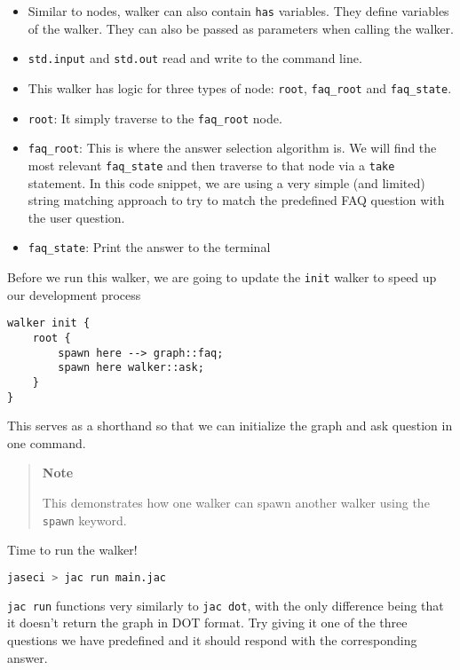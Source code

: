 \begin{itemize}
    \tightlist
    \item
          Similar to nodes, walker can also contain \lstinline!has! variables.
          They define variables of the walker. They can also be passed as
          parameters when calling the walker.
    \item
          \lstinline!std.input! and \lstinline!std.out! read and write to the
          command line.
    \item
          This walker has logic for three types of node: \lstinline!root!,
          \lstinline!faq_root! and \lstinline!faq_state!.
    \item
          \lstinline!root!: It simply traverse to the \lstinline!faq_root! node.
    \item
          \lstinline!faq_root!: This is where the answer selection algorithm is.
          We will find the most relevant \lstinline!faq_state! and then traverse
          to that node via a \lstinline!take! statement. In this code snippet,
          we are using a very simple (and limited) string matching approach to
          try to match the predefined FAQ question with the user question.
    \item
          \lstinline!faq_state!: Print the answer to the terminal
\end{itemize}

Before we run this walker, we are going to update the \lstinline!init!
walker to speed up our development process

\begin{lstlisting}
walker init {
    root {
        spawn here --> graph::faq;
        spawn here walker::ask;
    }
}
\end{lstlisting}

This serves as a shorthand so that we can initialize the graph and ask
question in one command.

\begin{quote}
    \textbf{Note}

    This demonstrates how one walker can spawn another walker using the
    \lstinline!spawn! keyword.
\end{quote}

Time to run the walker!

\begin{lstlisting}[language=bash]
jaseci > jac run main.jac
\end{lstlisting}

\lstinline!jac run! functions very similarly to \lstinline!jac dot!,
with the only difference being that it doesn't return the graph in DOT
format. Try giving it one of the three questions we have predefined and
it should respond with the corresponding answer.

